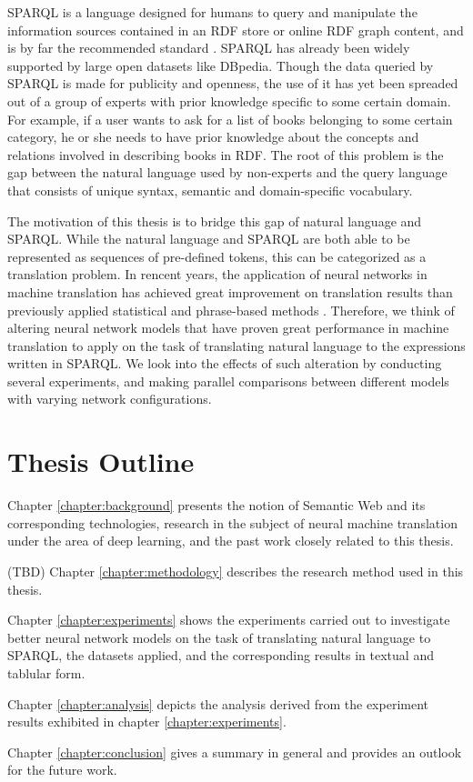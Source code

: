 SPARQL is a language designed for humans to query and manipulate the information sources contained in an RDF store or online RDF graph content, and is by far the recommended standard \cite{Harris2013}. SPARQL has already been widely supported by large open datasets like DBpedia. Though the data queried by SPARQL is made for publicity and openness, the use of it has yet been spreaded out of a group of experts with prior knowledge specific to some certain domain. For example, if a user wants to ask for a list of books belonging to some certain category, he or she needs to have prior knowledge about the concepts and relations involved in describing books in RDF. The root of this problem is the gap between the natural language used by non-experts and the query language that consists of unique syntax, semantic and domain-specific vocabulary. 

The motivation of this thesis is to bridge this gap of natural language and SPARQL. While the natural language and SPARQL are both able to be represented as sequences of pre-defined tokens, this can be categorized as a translation problem. In rencent years, the application of neural networks in machine translation has achieved great improvement on translation results than previously applied statistical and phrase-based methods \cite{Moussallem2017}. Therefore, we think of altering neural network models that have proven great performance in machine translation to apply on the task of translating natural language to the expressions written in SPARQL. We look into the effects of such alteration by conducting several experiments, and making parallel comparisons between different models with varying network configurations. 

\section{Thesis Outline} \label{section:thesis outline}

Chapter \ref{chapter:background} presents the notion of Semantic Web and its corresponding technologies, research in the subject of neural machine translation under the area of deep learning, and the past work closely related to this thesis. 

(TBD) Chapter \ref{chapter:methodology} describes the research method used in this thesis.

Chapter \ref{chapter:experiments} shows the experiments carried out to investigate better neural network models on the task of translating natural language to SPARQL, the datasets applied, and the corresponding results in textual and tablular form.

Chapter \ref{chapter:analysis} depicts the analysis derived from the experiment results exhibited in chapter \ref{chapter:experiments}.

Chapter \ref{chapter:conclusion} gives a summary in general and provides an outlook for the future work.